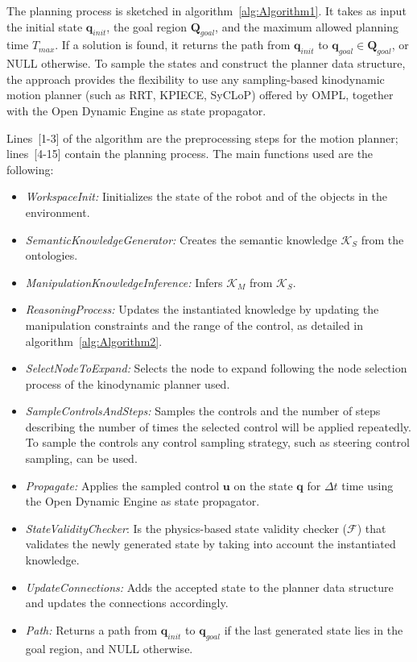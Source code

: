 \documentclass[twocolumn]{svjour3}          %
\begin{document}
The planning process is sketched in algorithm~\ref{alg:Algorithm1}. It takes as input the initial state $\mathbf{q}_{init}$, the goal region $\mathbf{Q}_{goal}$, and the maximum allowed planning time $T_{max}$. If a solution is found, it returns the path from $\mathbf{q}_{init}$ to $\mathbf{q}_{goal}\in\mathbf{Q}_{goal}$, or NULL otherwise. To sample the states and construct the planner  data structure, the approach provides the flexibility to use any sampling-based kinodynamic motion planner (such as RRT, KPIECE, SyCLoP) offered by OMPL, together with the Open Dynamic Engine as state propagator. 

Lines~[1-3] of the algorithm are the preprocessing steps for the motion planner; lines~[4-15] contain the planning process. The main functions used are the following:
\begin{itemize}
 \item \textit{WorkspaceInit:} Iinitializes the state of the robot and of the objects in the environment.
 \item \textit{SemanticKnowledgeGenerator:} Creates the semantic knowledge $\mathcal{K}_S$ from the ontologies. 
 \item \textit{ManipulationKnowledgeInference:} Infers $\mathcal{K}_M$ from $\mathcal{K}_S$. 
 \item \textit{ReasoningProcess:} Updates the instantiated knowledge by updating the manipulation constraints and the range of the control, as detailed in algorithm~\ref{alg:Algorithm2}.
\item \textit{SelectNodeToExpand:} Selects the node to expand following the node selection process of the kinodynamic planner used.
\item \textit{SampleControlsAndSteps:} Samples the controls and the number of steps describing the number of times the selected control will be applied repeatedly. To sample the controls any control 
sampling strategy, such as steering control sampling, can be used.
\item \textit{Propagate:} Applies the sampled control $\mathbf{u}$ on the state $\mathbf{q}$ for $\Delta t$ time using the Open Dynamic Engine as state propagator.
\item \textit{StateValidityChecker}: Is the physics-based state validity checker ($\mathcal{F}$) that validates the newly generated state by taking into account the instantiated knowledge.
\item \textit{UpdateConnections:} Adds the accepted state to the planner data structure and updates the connections accordingly.
\item \textit{Path:} Returns a path from $\mathbf{q}_{init}$ to $\mathbf{q}_{goal}$ if the last generated state lies in the goal region, and NULL otherwise.
\end{itemize}
 
\end{document}
